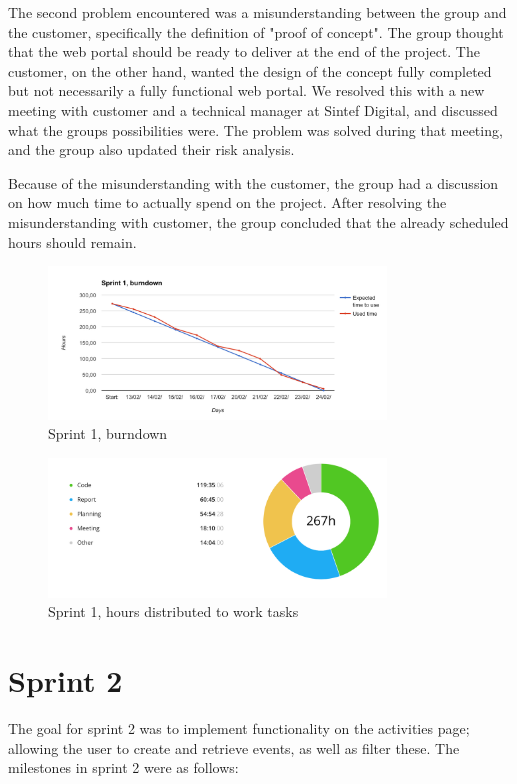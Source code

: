 The second problem encountered was a misunderstanding between the group and the customer, specifically the definition of "proof of concept". The group thought that the web portal should be ready to deliver at the end of the project. The customer, on the other hand, wanted the design of the concept fully completed but not necessarily a fully functional web portal. We resolved this with a new meeting with customer and a technical manager at Sintef Digital, and discussed what the groups possibilities were. The problem was solved during that meeting, and the group also updated their risk analysis.

Because of the misunderstanding with the customer, the group had a discussion on how much time to actually spend on the project. After resolving the misunderstanding with customer, the group concluded that the already scheduled hours should remain.


\begin{figure}[ht]
\centering
    \includegraphics[width=0.8\textwidth]{fig/sprint1}
\caption{Sprint 1, burndown}
\end{figure}

\begin{figure}[ht]
\centering
    \includegraphics[width=0.8\textwidth]{fig/sprint1-diagram}
\caption{Sprint 1, hours distributed to work tasks}
\end{figure}
  

\section{Sprint 2} 
\label{sprint2}
The goal for sprint 2 was to implement functionality on the activities page; allowing the user to create and retrieve events, as well as filter these. The milestones in sprint 2 were as follows:

